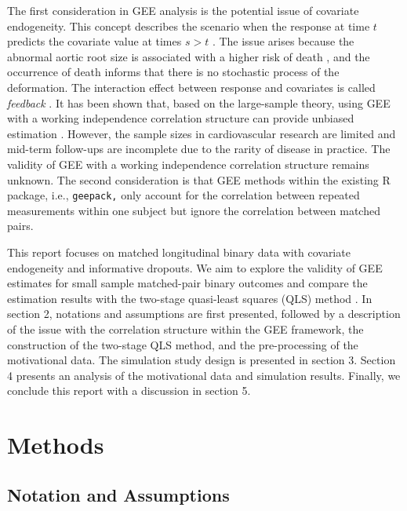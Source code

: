 \documentclass[
]{aft}
\begin{document}
The first consideration in GEE analysis is the potential issue of
covariate endogeneity. This concept describes the scenario when the
response at time \(t\) predicts the covariate value at times \(s > t\)
\citep{Diggle2002}. The issue arises because the abnormal aortic root
size is associated with a higher risk of death \citep{KITAGAWA2013258},
and the occurrence of death informs that there is no stochastic process
of the deformation. The interaction effect between response and
covariates is called \emph{feedback} \citep{Zeger1991}. It has been
shown that, based on the large-sample theory, using GEE with a working
independence correlation structure can provide unbiased estimation
\citep{Diggle2002, Liang1986}. However, the sample sizes in
cardiovascular research are limited and mid-term follow-ups are
incomplete due to the rarity of disease in practice. The validity of GEE
with a working independence correlation structure remains unknown. The
second consideration is that GEE methods within the existing R package,
i.e., \texttt{geepack,} only account for the correlation between
repeated measurements within one subject but ignore the correlation
between matched pairs.

This report focuses on matched longitudinal binary data with covariate
endogeneity and informative dropouts. We aim to explore the validity of
GEE estimates for small sample matched-pair binary outcomes and compare
the estimation results with the two-stage quasi-least squares (QLS)
method \citep{Mitani2019}. In section 2, notations and assumptions are
first presented, followed by a description of the issue with the
correlation structure within the GEE framework, the construction of the
two-stage QLS method, and the pre-processing of the motivational data.
The simulation study design is presented in section 3. Section 4
presents an analysis of the motivational data and simulation results.
Finally, we conclude this report with a discussion in section 5.

\section{Methods}\label{methods}

\subsection{Notation and Assumptions}\label{notation-and-assumptions}
\end{document}
